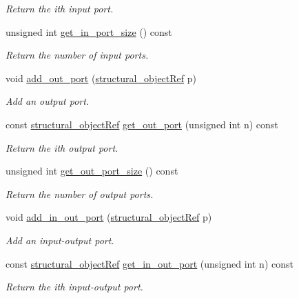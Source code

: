 \begin{DoxyCompactItemize}
\begin{DoxyCompactList}\small\item\em Return the ith input port. \end{DoxyCompactList}\item 
unsigned int \hyperlink{classmodule_aea3a2e04dfd2a7bd0c9e978d9d1b2454}{get\+\_\+in\+\_\+port\+\_\+size} () const
\begin{DoxyCompactList}\small\item\em Return the number of input ports. \end{DoxyCompactList}\item 
void \hyperlink{classmodule_aec52e66f2e98e3ae59f99b20a7760718}{add\+\_\+out\+\_\+port} (\hyperlink{structural__objects_8hpp_a8ea5f8cc50ab8f4c31e2751074ff60b2}{structural\+\_\+object\+Ref} p)
\begin{DoxyCompactList}\small\item\em Add an output port. \end{DoxyCompactList}\item 
const \hyperlink{structural__objects_8hpp_a8ea5f8cc50ab8f4c31e2751074ff60b2}{structural\+\_\+object\+Ref} \hyperlink{classmodule_a65622911a335dc1ddc695d49606dfc8e}{get\+\_\+out\+\_\+port} (unsigned int n) const
\begin{DoxyCompactList}\small\item\em Return the ith output port. \end{DoxyCompactList}\item 
unsigned int \hyperlink{classmodule_af2b9fb284dad89d2d0a6d43d257ebd9e}{get\+\_\+out\+\_\+port\+\_\+size} () const
\begin{DoxyCompactList}\small\item\em Return the number of output ports. \end{DoxyCompactList}\item 
void \hyperlink{classmodule_a4faf421d00ba2c16a003d6ef6ae41d75}{add\+\_\+in\+\_\+out\+\_\+port} (\hyperlink{structural__objects_8hpp_a8ea5f8cc50ab8f4c31e2751074ff60b2}{structural\+\_\+object\+Ref} p)
\begin{DoxyCompactList}\small\item\em Add an input-\/output port. \end{DoxyCompactList}\item 
const \hyperlink{structural__objects_8hpp_a8ea5f8cc50ab8f4c31e2751074ff60b2}{structural\+\_\+object\+Ref} \hyperlink{classmodule_ac12c995f1c9cdcfde91134b4101a976c}{get\+\_\+in\+\_\+out\+\_\+port} (unsigned int n) const
\begin{DoxyCompactList}\small\item\em Return the ith input-\/output port. \end{DoxyCompactList}\item 

\end{DoxyCompactItemize}
